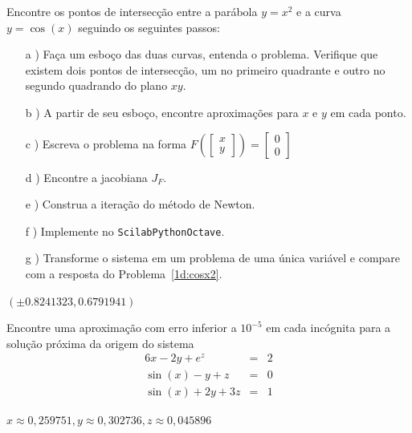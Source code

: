 \begin{exer} Encontre os pontos de intersecção entre a parábola $y=x^2$ e a curva $y=\cos(x)$ seguindo os seguintes passos:
\begin{itemize}
\item[a]) Faça um esboço das duas curvas, entenda o problema. Verifique que existem dois pontos de intersecção, um no primeiro quadrante e outro no segundo quadrando do plano $xy$.
\item[b]) A partir de seu esboço, encontre aproximações para $x$ e $y$ em cada ponto.
\item[c]) Escreva o problema na forma $F\left(\left[\begin{array}{c}x\\y\end{array}\right]\right)=\left[\begin{array}{c}0\\0\end{array}\right]$
\item[d]) Encontre a jacobiana $J_F$.
\item[e]) Construa a iteração do método de Newton.
\item[f]) Implemente no \ifisscilab\verb+Scilab+\fi\ifispython\verb+Python+\fi\ifisoctave\verb+Octave+\fi.
\item[g]) Transforme o sistema em um problema de uma única variável e compare com a resposta do Problema~\ref{1d:cosx2}.
\end{itemize}
\end{exer}

\begin{resp}
 $\left(\pm 0.8241323, 0.6791941\right)$
\end{resp}

\begin{exer} Encontre uma aproximação com erro inferior a $10^{-5}$ em cada incógnita para a solução próxima da origem do sistema
\begin{eqnarray*}
6x-2y+e^{z}&=&2\\
\sin(x)-y+z&=&0\\
\sin(x)+2y+3z&=&1
\end{eqnarray*}
\end{exer}
\begin{resp}
$x\approx 0,259751, y\approx  0,302736, z\approx  0,045896$
\end{resp}



